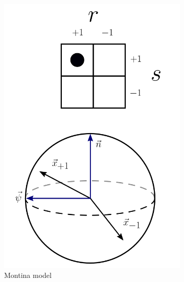 \documentclass[%
 reprint,
superscriptaddress,
nofootinbib,
 amsmath,amssymb,
 prx, 
 accepted=2019-09-27,
]{quantumarticle}
\begin{document}
\begin{figure}[t]
\begin{subfigure}[t]{0.24\textwidth}
 \includegraphics[width=\textwidth]{Montina_model_v2.png}
 \caption{Montina model}
 \label{fig:Montmodel}
 \end{subfigure}
 \begin{subfigure}[t]{0.24\textwidth}

\end{subfigure}
\end{figure}
\end{document}
